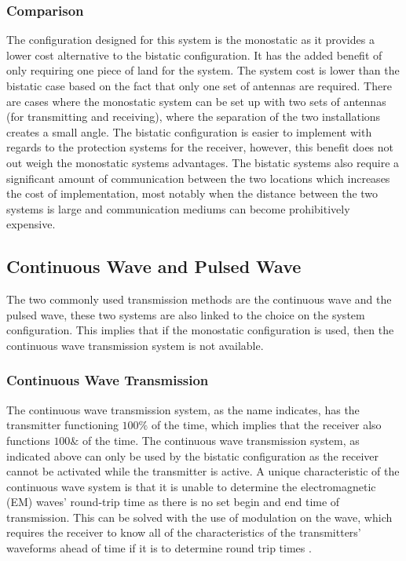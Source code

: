 \documentclass[11pt]{witseiepaper}
\begin{document}
\subsubsection{Comparison} \label{sec:Comparison}

The configuration designed for this system is the monostatic as it provides a lower cost alternative to the bistatic configuration. It has the added benefit of only requiring one piece of land for the system. The system cost is lower than the bistatic case based on the fact that only one set of antennas are required. There are cases where the monostatic system can be set up with two sets of antennas (for transmitting and receiving), where the separation of the two installations creates a small angle.
The bistatic configuration is easier to implement with regards to the protection systems for the receiver, however, this benefit does not out weigh the monostatic systems advantages. The bistatic systems also require a significant amount of communication between the two locations which increases the cost of implementation, most notably when the distance between the two systems is large and communication mediums can become prohibitively expensive.

\subsection{Continuous Wave and Pulsed Wave} \label{sec:ContinuousWaveandPulsedWave}

The two commonly used transmission methods are the continuous wave and the pulsed wave, these two systems are also linked to the choice on the system configuration.
This implies that if the monostatic configuration is used, then the continuous wave transmission system is not available.

\subsubsection{Continuous Wave Transmission} \label{sec:ContinuousWaveTransmission}

The continuous wave transmission system, as the name indicates, has the transmitter functioning $100\%$ of the time, which implies that the receiver also functions $100 \&$ of the time. The continuous wave transmission system, as indicated above can only be used by the bistatic configuration as the receiver cannot be activated while the transmitter is active.
A unique characteristic of the continuous wave system is that it is unable to determine the electromagnetic (EM) waves' round-trip time as there is no set begin and end time of transmission. This can be solved with the use of modulation on the wave, which requires the receiver to know all of the characteristics of the transmitters' waveforms ahead of time if it is to determine round trip times \cite[p.~20]{radarHandbook}.
\end{document}
